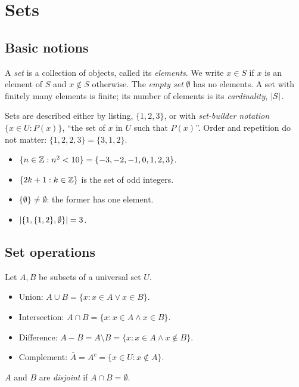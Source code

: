 \chapter{Sets}

\section{Basic notions}

\begin{definition}
A \emph{set} is a collection of objects, called its \emph{elements}. We write $x \in S$ if $x$
is an element of $S$ and $x \notin S$ otherwise. The \emph{empty set} $\emptyset$ has no
elements. A set with finitely many elements is finite; its number of elements is its
\emph{cardinality}, $\left\lvert S \right\rvert$.
\end{definition}

Sets are described either by listing, $\{1,2,3\}$, or with \emph{set-builder notation}
$\{x \in U : P(x)\}$, ``the set of $x$ in $U$ such that $P(x)$''. Order and repetition do not
matter: $\{1,2,2,3\} = \{3,1,2\}$.

\begin{example}
\begin{itemize}
  \item $\{n \in \mathbb{Z} : n^2 < 10\} = \{-3,-2,-1,0,1,2,3\}$.
  \item $\{2k + 1 : k \in \mathbb{Z}\}$ is the set of odd integers.
  \item $\{\emptyset\} \ne \emptyset$: the former has one element.
  \item $\left\lvert \{1,\{1,2\},\emptyset\} \right\rvert = 3$.
\end{itemize}
\end{example}

\section{Set operations}

Let $A,B$ be subsets of a universal set $U$.

\begin{definition}
\begin{itemize}
  \item Union: $A \cup B = \{x : x \in A \vee x \in B\}$.
  \item Intersection: $A \cap B = \{x : x \in A \wedge x \in B\}$.
  \item Difference: $A - B = A \setminus B = \{x : x \in A \wedge x \notin B\}$.
  \item Complement: $\bar A = A^c = \{x \in U : x \notin A\}$.
\end{itemize}
$A$ and $B$ are \emph{disjoint} if $A \cap B = \emptyset$.
\end{definition}

